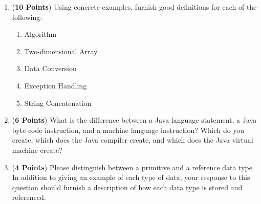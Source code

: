 \documentclass[12pt]{article}
\begin{document}
\begin{enumerate}

  \item ({\bf 10 Points}) Using concrete examples, furnish good definitions for each of the following:

\begin{enumerate}

\item Algorithm
  \vspace*{1.2in}

\item Two-dimensional Array 
  \vspace*{1.2in}

\item Data Conversion 
  \vspace*{1.2in}

\item Exception Handling 
  \vspace*{1.2in}

\item String Concatenation
  \vspace*{1.2in}

\end{enumerate}



\newpage

\item ({\bf 6 Points}) What is the difference between a Java language statement, a Java byte code instruction, and a
  machine language instruction?  Which do you create, which does the Java compiler create, and which does the Java
  virtual machine create?
  \vspace*{4in}

\item ({\bf 4 Points}) Please distinguish between a primitive and a reference data type.  In addition to giving an
  example of each type of data,  your response to this question should furnish a description of how each data type is
  stored and referenced.  
  
  \newpage


\end{enumerate}
\end{document}
